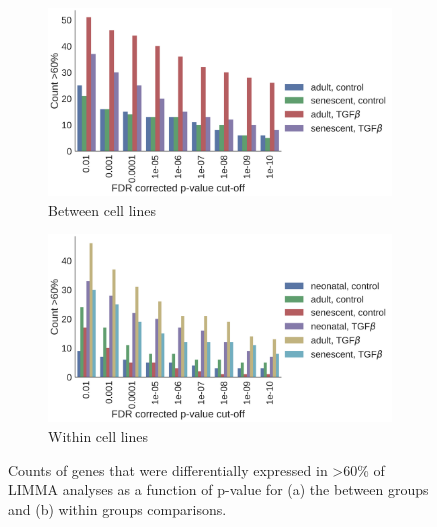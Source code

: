 \documentclass[alpha-refs]{wiley-article}
\newcommand{\tgf}{TGF-$\upbeta$}
\begin{document}
\begin{figure}
	\begin{subfigure}{0.45\linewidth}
		\includegraphics[width=\linewidth]{LIMMA09_2018/SavedObjects/between_pvalue_counts}
		\caption{Between cell lines}
		\label{fig:pvalues:between}
	\end{subfigure}
	\begin{subfigure}{0.45\linewidth}
		\includegraphics[width=\linewidth]{LIMMA09_2018/SavedObjects/within_pvalue_counts}
		\caption{Within cell lines}
		\label{fig:pvalues:within}
	\end{subfigure}
	\caption{Counts of genes that were differentially expressed in >60\% of LIMMA analyses as a function of p-value for (a) the between groups and (b) within groups comparisons.}
	\label{fig:pvalues}
\end{figure}


\end{document}
